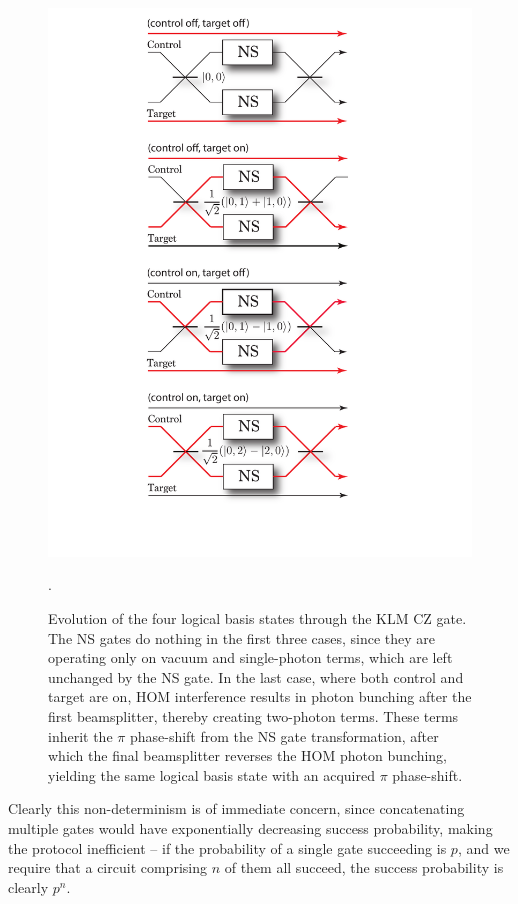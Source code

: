 \documentclass[aps, rmp, twocolumn, amsmath, amssymb, nofootinbib, superscriptaddress, longbibliography, floatfix, table-of-contents, eqsecnum]{revtex4-1}
\begin{document}
\begin{figure}[!htb]
\includegraphics[width=0.9\columnwidth]{KLM_optical_paths}
\caption{Evolution of the four logical basis states through the KLM CZ gate. The NS gates do nothing in the first three cases, since they are operating only on vacuum and single-photon terms, which are left unchanged by the NS gate. In the last case, where both control and target are on, HOM interference results in photon bunching after the first beamsplitter, thereby creating two-photon terms. These terms inherit the $\pi$ phase-shift from the NS gate transformation, after which the final beamsplitter reverses the HOM photon bunching, yielding the same logical basis state with an acquired $\pi$ phase-shift.}. \label{fig:KLM_explain} 
\end{figure}

Clearly this non-determinism is of immediate concern, since concatenating multiple gates would have exponentially decreasing success probability, making the protocol inefficient -- if the probability of a single gate succeeding is $p$, and we require that a circuit comprising $n$ of them all succeed, the success probability is clearly $p^n$.
\end{document}
